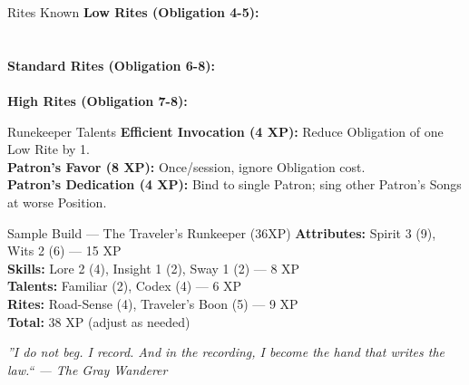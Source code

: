 \documentclass[10pt]{article}
\begin{document}
\begin{minipage}[t]{0.48\linewidth}
    \begin{charbox}{Rites Known}
        \textbf{Low Rites (Obligation 4-5):}\\
        \underline{\hspace{7cm}}\\
        \underline{\hspace{7cm}}\\
        \textbf{Standard Rites (Obligation 6-8):}\\
        \underline{\hspace{7cm}}\\
        \textbf{High Rites (Obligation 7-8):}\\
        \underline{\hspace{7cm}}
    \end{charbox}
    
    \vspace{0.5em}
    
    \begin{charbox}{Runekeeper Talents}
        \textbf{Efficient Invocation (4 XP):} Reduce Obligation of one Low Rite by 1.\\
        \textbf{Patron's Favor (8 XP):} Once/session, ignore Obligation cost.\\
        \textbf{Patron's Dedication (4 XP):} Bind to single Patron; sing other Patron's Songs at worse Position.
    \end{charbox}
    
    \vspace{0.5em}
    
    \begin{charbox}{Sample Build --- The Traveler's Runkeeper (36XP)}
        \textbf{Attributes:} Spirit 3 (9), Wits 2 (6) --- 15 XP\\
        \textbf{Skills:} Lore 2 (4), Insight 1 (2), Sway 1 (2) --- 8 XP\\
        \textbf{Talents:} Familiar (2), Codex (4) --- 6 XP\\
        \textbf{Rites:} Road-Sense (4), Traveler's Boon (5) --- 9 XP\\
        \textbf{Total:} 38 XP (adjust as needed)
    \end{charbox}
\end{minipage}

\vspace{0.5em}
\begin{center}
    {\small\sffamily\itshape ''I do not beg. I record. And in the recording, I become the hand that writes the law.`` --- The Gray Wanderer}
\end{center}
\end{document}
